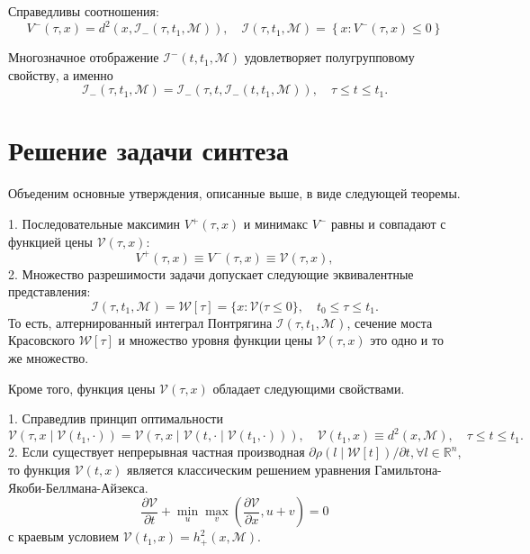 \begin{lemma}
    Справедливы соотношения:
    \[
        V^-(\tau, x) = d^2(x, \mathcal{I}_-(\tau, t_1, \mathcal{M})), \quad
        \mathcal{I}(\tau, t_1, \mathcal{M}) = \left\{ x : V^-(\tau, x) \le 0 \right\} 
    \]
\end{lemma}

\begin{lemma}
    Многозначное отображение \( \mathcal{I}^-(t, t_1, \mathcal{M}) \) удовлетворяет полугрупповому
     свойству, а именно
    \[
        \mathcal{I}_-(\tau, t_1, \mathcal{M}) = \mathcal{I}_-(\tau, t, \mathcal{I}_-(t, t_1,
         \mathcal{M})), \quad \tau \le t \le t_1.
    \]

\end{lemma}


\section{Решение задачи синтеза}
Объеденим основные утверждения, описанные выше, в виде следующей теоремы.
\begin{theorem}
    1. Последовательные максимин \( V^+(\tau, x) \) и минимакс \( V^-\) равны и совпадают с функцией
     цены \( \mathcal{V}(\tau,x) \):
    \begin{equation*}
        V^+(\tau, x) \equiv V^-(\tau, x) \equiv \mathcal{V}(\tau, x),
    \end{equation*}
    2. Множество разрешимости задачи допускает следующие эквивалентные представления:
    \begin{equation*}
        \mathcal{I}(\tau, t_1, \mathcal{M}) = \mathcal{W}[\tau] = \{ x : \mathcal{V}(\tau \le 0 \},
         \quad t_0 \le \tau \le t_1.
    \end{equation*}
    То есть, алтернированный интеграл Понтрягина \( \mathcal{I}(\tau, t_1, \mathcal{M}) \), сечение
     моста Красовского \( \mathcal{W}[\tau] \) и множество уровня функции цены
     \( \mathcal{V}(\tau, x) \) это одно и то же множество.
\end{theorem}
Кроме того, функция цены \( \mathcal{V}(\tau, x) \) обладает следующими свойствами.
\begin{theorem}
    1. Справедлив принцип оптимальности
    \begin{equation*}
        \mathcal{V}(\tau, x \mid \mathcal{V}(t_1, \cdot)) = \mathcal{V}(\tau, x \mid \mathcal{V}(t, 
         \cdot \mid \mathcal{V}(t_1, \cdot))), \quad \mathcal{V}(t_1, x) \equiv d^2(x, \mathcal{M}),
         \quad \tau \le t \le t_1. 
    \end{equation*}
    2. Если существует непрерывная частная производная \( \partial \rho(l \mid \mathcal{W}[t]) / 
     \partial t, \forall l \in \mathbb{R}^n \), то функция \( \mathcal{V}(t, x) \) является 
     классическим решением уравнения Гамильтона-Якоби-Беллмана-Айзекса.
    \begin{equation*}
        \frac{\partial \mathcal{V}}{\partial t} + \min_u \max_v \left( \frac{\partial \mathcal{V}}
         {\partial x}, u + v \right) = 0
    \end{equation*}
    с краевым условием \( \mathcal{V}(t_1, x) = h_+^2(x, \mathcal{M}) \).
\end{theorem}

